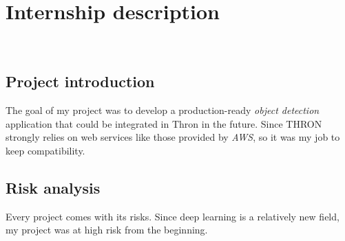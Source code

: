 
\chapter{Internship description}
\label{chap:internship-description}

\\

\section{Project introduction}
The goal of my project was to develop a production-ready \emph{object detection} application that could be integrated in Thron in the future. Since THRON strongly relies on web services like those provided by \emph{\gls{AWS}}\glsfirstoccur, so it was my job to keep compatibility.
\section{Risk analysis}

Every project comes with its risks. Since deep learning is a relatively new field, my project was at high risk from the beginning.\\


